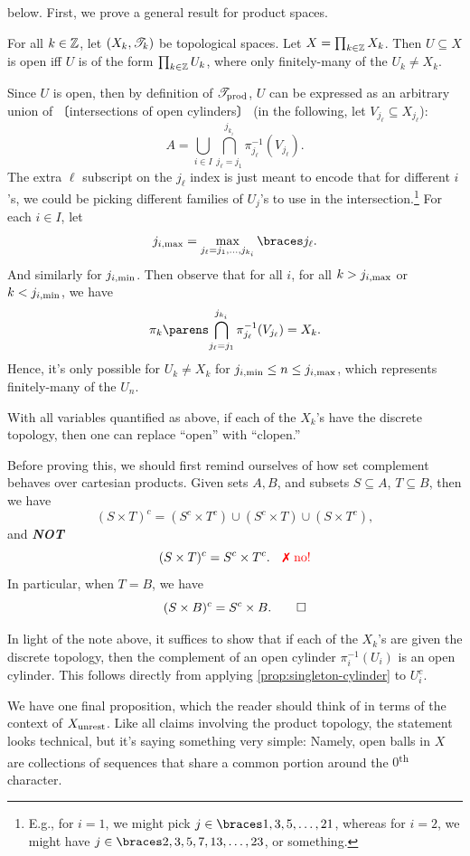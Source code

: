 \documentclass{fkpaper}
\newcommand{\np}[1]{\hspace{-.55em}〔#1〕\hspace{-.55em}}
\begin{document}
\begin{multicols}{2}
below. First, we prove a general result for product spaces.
\begin{proposition}\label{prop:openness-in-products}
  For all $k \in \mathbb{Z}$, let $(X_k, {\mathscr{T}}_k)$ be topological spaces. Let
  $X = \prod_{k \in \mathbb{Z}} X_k$. Then $U \subseteq X$ is open iff $U$ is
  of the form $\prod_{k \in \mathbb{Z}} U_k$, where only finitely-many of the
  $U_k \neq X_k$.
\end{proposition}
\begin{sproof}
  Since $U$ is open, then by definition of ${\mathscr{T}}_{\rm prod}$, $U$ can
  be expressed as an arbitrary union of \np{intersections of open
    cylinders} (in the following, let $V_{j_\ell} \subseteq X_{j_\ell}$):
  \[
    A = \bigcup_{i \in I} \bigcap_{j_\ell = j_1}^{j_{k_i}}
    \pi_{j_\ell}^{-1}(V_{j_\ell}).
  \]
  The extra $\ell$ subscript on the $j_\ell$ index is just meant to encode
  that for different $i$'s, we could be picking different families of
  $U_j$'s to use in the intersection.\footnote{E.g., for $i = 1$, we
    might pick $j \in \set{1, 3, 5, \ldots, 21}$, whereas for $i = 2$,
    we might have $j \in \set{2, 3, 5, 7, 13, \ldots, 23}$, or
    something.} For each $i \in I$, let
  \[
    j_{i, {\rm max}} = \max_{j_\ell = j_1, \ldots, j_{k_i}} \set{j_\ell}.
  \]
  And similarly for $j_{i, {\rm min}}$. Then observe that for all $i$,
  for all $k > j_{i, {\rm max}}$ or $k < j_{i, {\rm min}}$, we have
  \[
    \pi_{k} \pn{\bigcap_{j_\ell = j_1}^{j_{k_i}}
      \pi_{j_\ell}^{-1}(V_{j_\ell})} = X_{k}.
  \]
  Hence, it's only possible for $U_k \neq X_k$ for $j_{i, {\rm
      min}}\leq n \leq j_{i, {\rm max}}$, which represents
  finitely-many of the $U_n$.
\end{sproof}
\begin{proposition}\label{prop:clopen-discrete}
  With all variables quantified as above, if each of the $X_k$'s have
  the discrete topology, then one can replace ``open'' with
  ``clopen.''
\end{proposition}
Before proving this, we should first remind ourselves of how set
complement behaves over cartesian products. Given sets $A,B$, and
subsets $S \subseteq A$, $T \subseteq B$, then we have
\[
  (S \times T)^c = (S^c \times T^c) \cup (S^c \times T) \cup (S
  \times T^c),
\]
and \textbf{\emph{NOT}}
\[
  (S \times T)^c = S^c \times T^c. \quad {\color{red} \xmark \text{
      no!}}
\]
In particular, when $T = B$, we have
\[
  (S \times B)^c = S^c \times B. \qedhere
\]
\begin{sproof}
  In light of the note above, it suffices to show that if each of the
  $X_k$'s are given the discrete topology, then the complement of an
  open cylinder $\pi_i^{-1}(U_i)$ is an open cylinder. This follows
  directly from applying \cref{prop:singleton-cylinder} to $U_i^c$.
\end{sproof}
We have one final proposition, which the reader should think of in
terms of the context of $X_{\rm unrest}$. Like all claims involving
the product topology, the statement looks technical, but it's saying
something very simple: Namely, open balls in $X$ are collections of
sequences that share a common portion around the
$0$\textsuperscript{th} character.


\end{multicols}
\end{document}
